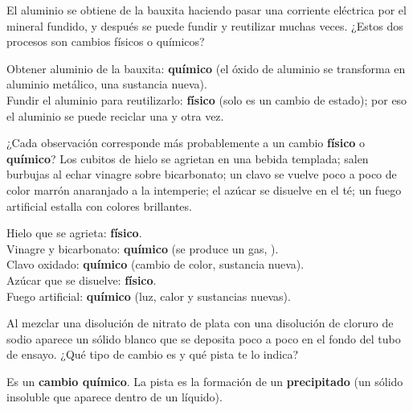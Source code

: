 \begin{exercise}
    El aluminio se obtiene de la bauxita haciendo pasar una corriente eléctrica por el mineral fundido, y después se puede fundir y reutilizar muchas veces. ¿Estos dos procesos son cambios físicos o químicos?
    \begin{solu}
        Obtener aluminio de la bauxita: \textbf{químico} (el óxido de aluminio se transforma en aluminio metálico, una sustancia nueva). \\
        Fundir el aluminio para reutilizarlo: \textbf{físico} (solo es un cambio de estado); por eso el aluminio se puede reciclar una y otra vez.
    \end{solu}
\end{exercise}

\begin{exercise}
    ¿Cada observación corresponde más probablemente a un cambio \textbf{físico} o \textbf{químico}? Los cubitos de hielo se agrietan en una bebida templada; salen burbujas al echar vinagre sobre bicarbonato; un clavo se vuelve poco a poco de color marrón anaranjado a la intemperie; el azúcar se disuelve en el té; un fuego artificial estalla con colores brillantes.
    \begin{solu}
        Hielo que se agrieta: \textbf{físico}. \\
        Vinagre y bicarbonato: \textbf{químico} (se produce un gas, ). \\
        Clavo oxidado: \textbf{químico} (cambio de color, sustancia nueva). \\
        Azúcar que se disuelve: \textbf{físico}. \\
        Fuego artificial: \textbf{químico} (luz, calor y sustancias nuevas).
    \end{solu}
\end{exercise}

\begin{exercise}
    Al mezclar una disolución de nitrato de plata con una disolución de cloruro de sodio aparece un sólido blanco que se deposita poco a poco en el fondo del tubo de ensayo. ¿Qué tipo de cambio es y qué pista te lo indica?
    \begin{solu}
        Es un \textbf{cambio químico}. La pista es la formación de un \textbf{precipitado} (un sólido insoluble que aparece dentro de un líquido).
    \end{solu}
\end{exercise}


